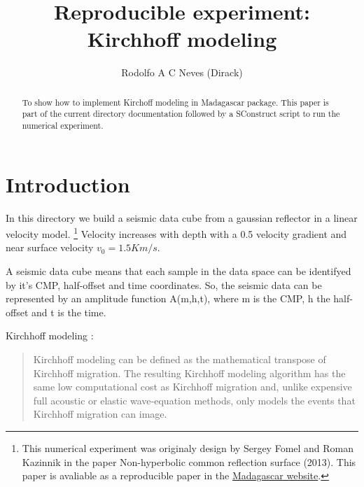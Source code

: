 \title{Reproducible experiment: Kirchhoff modeling}

\author{Rodolfo A C Neves (Dirack)}
\begin{abstract}
To show how to implement Kirchoff modeling in Madagascar
package. This paper is part of the current directory 
documentation followed by a SConstruct script
to run the numerical experiment.
\end{abstract}

\section{Introduction}

\indent In this directory we build a seismic data cube from a gaussian reflector in a linear velocity model.
\footnote{This numerical experiment was originaly 
design by Sergey Fomel and Roman Kazinnik in 
the paper Non-hyperbolic common reflection surface
(2013). 
This paper is avaliable as a reproducible paper in
the \href{http://www.ahay.org}{Madagascar website}.}
Velocity increases with depth with a 0.5 
velocity gradient and near surface velocity 
$v_0=1.5Km/s$.

\indent A seismic data cube means that each sample
in the data space can be identifyed by it's CMP, 
half-offset and time coordinates. So, the seismic 
data can be represented by an amplitude function
A(m,h,t), where m is the CMP, h the half-offset
and t is the time.

Kirchhoff modeling \cite[]{km}:

\begin{quote}
Kirchhoff modeling can be defined as the 
mathematical transpose of Kirchhoff migration.
The resulting Kirchhoff modeling algorithm 
has the same low computational cost as 
Kirchhoff migration and, unlike expensive full 
acoustic or elastic wave‐equation methods, 
only models the events that Kirchhoff migration
can image.
\end{quote}






